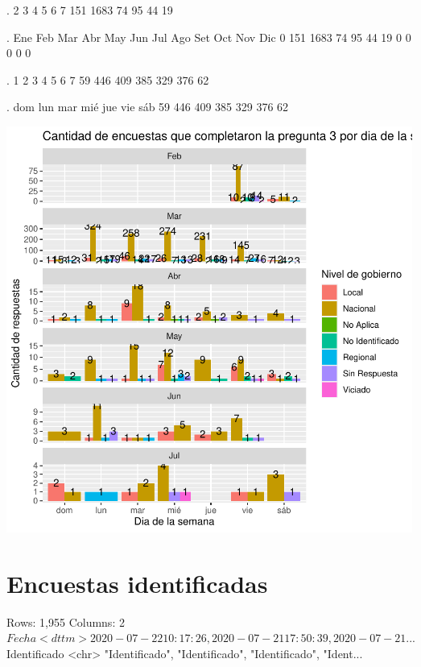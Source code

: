 \documentclass{article}
\begin{document}
\begin{Schunk}
\begin{Soutput}
.
   2    3    4    5    6    7 
 151 1683   74   95   44   19 
\end{Soutput}
\begin{Soutput}
.
 Ene  Feb  Mar  Abr  May  Jun  Jul  Ago  Set  Oct  Nov  Dic 
   0  151 1683   74   95   44   19    0    0    0    0    0 
\end{Soutput}
\begin{Soutput}
.
  1   2   3   4   5   6   7 
 59 446 409 385 329 376  62 
\end{Soutput}
\begin{Soutput}
.
dom lun mar mié jue vie sáb 
 59 446 409 385 329 376  62 
\end{Soutput}
\end{Schunk}
\includegraphics{seguimientov4-006}

\section{Encuestas identificadas}

\begin{Schunk}
\begin{Soutput}
Rows: 1,955
Columns: 2
$ Fecha        <dttm> 2020-07-22 10:17:26, 2020-07-21 17:50:39, 2020-07-21 ...
$ Identificado <chr> "Identificado", "Identificado", "Identificado", "Ident...
\end{Soutput}
\end{Schunk}
\end{document}
